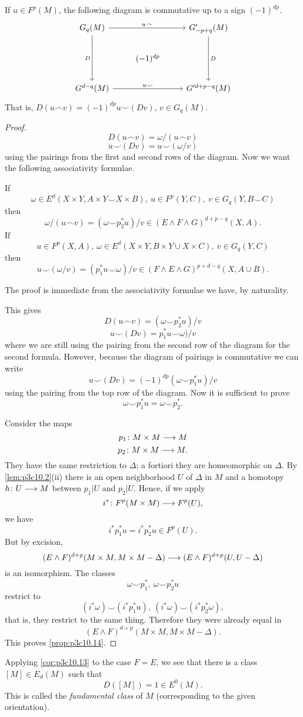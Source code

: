 \documentclass[../main]{subfiles}
\begin{document}
\begin{proposition}\label{prop:p3c10.14}
If $u \in F^p(M)$, the following diagram is commutative up to a sign $(-1)^{dp}$.
\[
\begin{tikzcd}
G_q(M) \arrow[rr, "u \frown"] \arrow[dd, "D"'] &           & G'_{-p + q}(M) \arrow[dd, "D"] \\
                                               & (-1)^{dp} &                                \\
G^{d - q}(M) \arrow[rr, "u \smile"]            &           & G'^{d + p - q}(M)             
\end{tikzcd}
\] 
That is, $D(u \frown v) = (-1)^{dp} u \smile (Dv)$, $v \in G_q(M)$.
\end{proposition}
\begin{proof}
\[D(u \frown v) = \omega / (u \frown v)\] 
\[u \smile (Dv) = u \smile (\omega / v)\]
using the pairings from the first and second rows of the diagram.
Now we want the following associativity formulae.
\begin{lemma}\label{lem:p3c10.15}
If
\[\omega \in E^d(X \times Y, A \times Y \smile X \times B), \ u \in F^p(Y,C), \ v \in G_q(Y,B \smile C)\]
then 
\[\omega / (u \frown v) = (\omega \smile p_2^*u)/v \in (E \wedge F \wedge G)^{d+p-q}(X,A).\]
If \[u \in F^p(X,A), \ \omega \in E^d(X \times Y, B \times Y \cup X \times C), \ v \in G_q(Y,C)\]
then
\[u \smile (\omega / v) = (p_1^* u \smile \omega)/v \in (F \wedge E \wedge G)^{p+d-q}(X,A \cup B).\]
\end{lemma}
The proof is immediate from the associativity formulae we have, by naturality.

This gives
\[D(u \frown v) = (\omega \smile p_2^* u)/v\]
\[u \smile (Dv) = p_1^* u \smile \omega)/v\]
where we are still using the pairing from the second row of the diagram for the second formula. However, because the diagram of pairings is commutative we can write 
\[u \smile (Dv) = (-1)^{dp}(\omega \smile p_1^* u)/v\]
using the pairing from the top row of the diagram. Now it is sufficient to prove
\[\omega \smile p_1^* u = \omega \smile p_2^*.\]

Consider the maps
\[p_1 \colon M \times M \longrightarrow M\]
\[p_2 \colon M \times M \longrightarrow M.\]
They have the same restriction to $\Delta$; a fortiori they are homeomorphic on $\Delta$. By \ref{lem:p3c10.2}(ii) there is an open neighborhood $U$ of $\Delta$ in $M$ and a homotopy $h \colon U \longrightarrow M$  between $p_1|U$ and $p_2|U$. Hence, if we apply
\[i^*\colon F^p(M \times M) \longrightarrow F^p(U),\]
we have
\[i^* p^*_1 u = i^* p^*_2 u \in F^p(U).\]
But by excision,
\[(E \wedge F)^{d+p}(M \times M, M \times M - \Delta) \longrightarrow (E \wedge F)^{d+p}(U,U-\Delta)\]
is an isomorphism. The classes 
\[\omega \smile p_1^*, \ \omega \smile p_2^*u\]
restrict to 
\[(i^*\omega) \smile (i^*p_1^*u), \ (i^*\omega) \smile (i^* p_2^* \omega),\]
that is, they restrict to the same thing. Therefore they were already equal in
\[(E \wedge F)^{d+p}(M \times M, M \times M - \Delta).\]
This proves \ref{prop:p3c10.14}.
\end{proof}
Applying \ref{cor:p3c10.13} to the case $F=E$, we see that there is a class $[M] \in E_d(M)$ such that
\[D([M]) = 1 \in E^0(M).\]
This is called the \emph{fundamental class}  of $M$ (corresponding to the given orientation).
\end{document}
